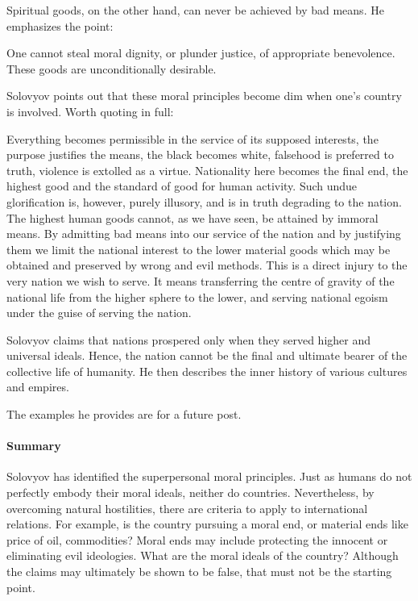 Spiritual goods, on the other hand, can never be achieved by bad means. He emphasizes the point:

\begin{quotex}
One cannot steal moral dignity, or plunder justice, of appropriate benevolence. These goods are unconditionally desirable.

\end{quotex}
Solovyov points out that these moral principles become dim when one's country is involved. Worth quoting in full:

\begin{quotex}
Everything becomes permissible in the service of its supposed interests, the purpose justifies the means, the black becomes white, falsehood is preferred to truth, violence is extolled as a virtue. Nationality here becomes the final end, the highest good and the standard of good for human activity. Such undue glorification is, however, purely illusory, and is in truth degrading to the nation. The highest human goods cannot, as we have seen, be attained by immoral means. By admitting bad means into our service of the nation and by justifying them we limit the national interest to the lower material goods which may be obtained and preserved by wrong and evil methods. This is a direct injury to the very nation we wish to serve. It means transferring the centre of gravity of the national life from the higher sphere to the lower, and serving national egoism under the guise of serving the nation.

\end{quotex}
Solovyov claims that nations prospered only when they served higher and universal ideals. Hence, the nation cannot be the final and ultimate bearer of the collective life of humanity. He then describes the inner history of various cultures and empires.

The examples he provides are for a future post.

\paragraph{Summary}
Solovyov has identified the superpersonal moral principles. Just as humans do not perfectly embody their moral ideals, neither do countries. Nevertheless, by overcoming natural hostilities, there are criteria to apply to international relations. For example, is the country pursuing a moral end, or material ends like price of oil, commodities? Moral ends may include protecting the innocent or eliminating evil ideologies. What are the moral ideals of the country? Although the claims may ultimately be shown to be false, that must not be the starting point.

